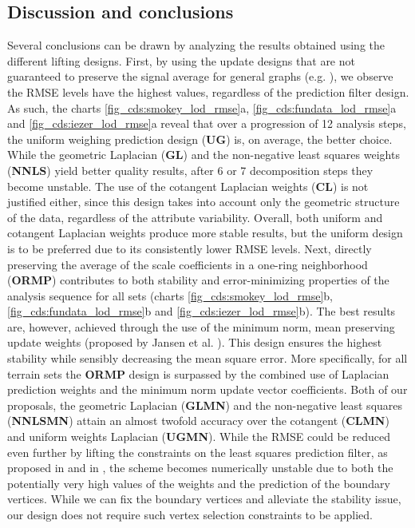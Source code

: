 \documentclass[graybox]{svmult}
\begin{document}
\subsection{Discussion and conclusions}
Several conclusions can be drawn by analyzing the results obtained using the different lifting designs. First, by using the update designs that are not guaranteed to preserve the signal average for general graphs (e.g. \cite{ Martinez2011}), we observe the RMSE levels have the highest values, regardless of the prediction filter design. As such, the charts \ref{fig_cds:smokey_lod_rmse}a, \ref{fig_cds:fundata_lod_rmse}a and \ref{fig_cds:iezer_lod_rmse}a reveal that over a progression of 12 analysis steps, the uniform weighing prediction design (\textbf{UG}) is, on average, the better choice. While the geometric Laplacian (\textbf{GL}) and the non-negative least squares weights (\textbf{NNLS}) yield better quality results, after  6 or 7 decomposition steps they become unstable. The use of the cotangent Laplacian weights (\textbf{CL}) is not justified either, since this design takes into account only the geometric structure of the data, regardless of the attribute variability. Overall, both uniform and cotangent Laplacian weights produce more stable results, but the uniform design is to be preferred due to its consistently lower RMSE levels. Next, directly preserving the average of the scale coefficients in a one-ring neighborhood (\textbf{ORMP}) contributes to both  stability and error-minimizing properties of the analysis sequence for all sets (charts \ref{fig_cds:smokey_lod_rmse}b, \ref{fig_cds:fundata_lod_rmse}b and \ref{fig_cds:iezer_lod_rmse}b). The best results are, however, achieved through the use of the minimum norm, mean preserving update weights (proposed by Jansen et al. \cite{Jansen2001}). This design ensures the highest stability while sensibly decreasing the mean square error. More specifically, for all terrain sets the \textbf{ORMP} design is surpassed by the combined use of Laplacian prediction weights and the minimum norm update vector coefficients. Both of our proposals, the geometric Laplacian (\textbf{GLMN}) and the non-negative least squares (\textbf{NNLSMN}) attain an almost twofold accuracy over the cotangent (\textbf{CLMN}) and uniform weights Laplacian (\textbf{UGMN}). While the RMSE could be reduced even further by lifting the constraints on the least squares prediction filter, as proposed in \cite{Wagner2005} and in \cite{Martinez2011}, the scheme becomes numerically unstable due to both the potentially very high values of the weights and the prediction of the boundary vertices. While we can fix the boundary vertices and alleviate the stability issue, our design does not require such vertex selection constraints to be applied.
\end{document}
